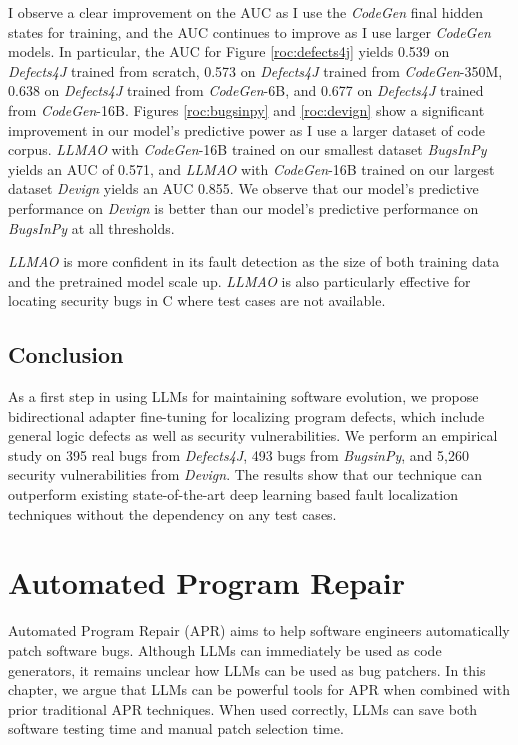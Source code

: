 \documentclass[12pt,openany,oneside,table]{cmuthesis}
\begin{document}
I observe a clear improvement on the AUC as I use the \textit{CodeGen} final hidden states for training, and the AUC continues to improve as I use larger \textit{CodeGen} models. 
In particular, the AUC for Figure \ref{roc:defects4j} yields 0.539 on \textit{Defects4J} trained from scratch, 0.573 on \textit{Defects4J} trained from \textit{CodeGen}-350M, 0.638 on \textit{Defects4J} trained from \textit{CodeGen}-6B, and 0.677 on \textit{Defects4J} trained from \textit{CodeGen}-16B.
Figures \ref{roc:bugsinpy} and \ref{roc:devign} show a significant improvement in our model's predictive power as I use a larger dataset of code corpus. \textit{LLMAO} with \textit{CodeGen}-16B trained on our smallest dataset \textit{BugsInPy} yields an AUC of 0.571, and \textit{LLMAO} with \textit{CodeGen}-16B trained on our largest dataset \textit{Devign} yields an AUC 0.855. We observe that our model's predictive performance on \textit{Devign} is better than our model's predictive performance on \textit{BugsInPy} at all thresholds.

    \begin{tcolorbox}
    [colback=white,colframe=black,arc=0pt,boxrule=0.5pt,title=RQ4 Summary,boxsep=2pt,left=1pt,right=1pt,top=1pt,bottom=1pt,fonttitle=\bfseries]
    \textit{LLMAO} is more confident in its fault detection as the size of both training data and the pretrained model scale up. \textit{LLMAO} is also particularly effective for locating security bugs in C where test cases are not available.

    \vspace{0.5em}
    \end{tcolorbox}

\section{Conclusion}
\label{sec:LLMAO-conclusion}
As a first step in using LLMs for maintaining software evolution, we propose bidirectional adapter fine-tuning for localizing program defects, which include general logic defects as well as security vulnerabilities. We perform an empirical study on 395 real bugs from \textit{Defects4J}, 493 bugs from \textit{BugsinPy}, and 5,260 security vulnerabilities from \textit{Devign}. The results show that our technique can outperform existing state-of-the-art deep learning based fault localization techniques without the dependency on any test cases.

\chapter{Automated Program Repair}
\label{ch:entropy}
Automated Program Repair (APR) aims to help software engineers automatically patch software bugs. Although LLMs can immediately be used as code generators, it remains unclear how LLMs can be used as bug patchers.
In this chapter, we argue that LLMs can be powerful tools for APR when combined with prior traditional APR techniques. When used correctly, LLMs can save both software testing time and manual patch selection time.
\end{document}
